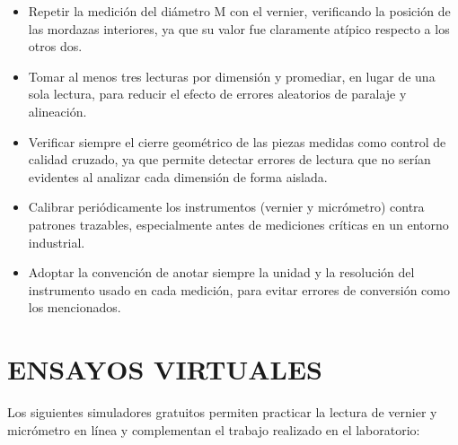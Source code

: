 \documentclass[12pt,a4paper]{article}
\begin{document}
\begin{itemize}
	\item Repetir la medición del diámetro M con el vernier, verificando la
	      posición de las mordazas interiores, ya que su valor fue
	      claramente atípico respecto a los otros dos.\\[-10pt]
	\item Tomar al menos tres lecturas por dimensión y promediar, en lugar de una
	      sola lectura, para reducir el efecto de errores aleatorios de paralaje y
	      alineación.\\[-10pt]
	\item Verificar siempre el cierre geométrico de las piezas medidas como
	      control de calidad cruzado, ya que permite detectar errores de lectura
	      que no serían evidentes al analizar cada dimensión de forma
	      aislada.\\[-10pt]
	\item Calibrar periódicamente los instrumentos (vernier y micrómetro) contra
	      patrones trazables, especialmente antes de mediciones críticas en un
	      entorno industrial.\\[-10pt]
	\item Adoptar la convención de anotar siempre la unidad y la resolución del
	      instrumento usado en cada medición, para evitar errores de conversión
	      como los mencionados.
\end{itemize}

\section{ENSAYOS VIRTUALES}

Los siguientes simuladores gratuitos permiten practicar la lectura de vernier y
micrómetro en línea y complementan el trabajo realizado en el laboratorio:
\end{document}
